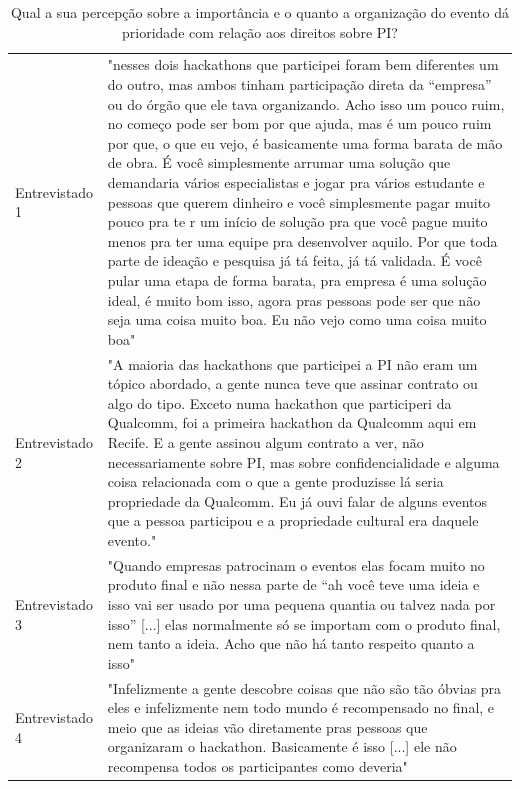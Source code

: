 \begin{table}[H]
\centering
\caption{Qual a sua percepção sobre a importância e o quanto a organização do evento dá prioridade com relação aos direitos sobre PI?}
\label{tab:importancia-prioridade-PI}
\begin{tabular}{l|p{}}

Entrevistado 1 &
  "nesses dois hackathons que participei foram bem diferentes um do outro, mas ambos tinham participação direta da “empresa” ou do órgão que ele tava organizando. Acho isso um pouco ruim, no começo pode ser bom por que ajuda, mas é um pouco ruim por que, o que eu vejo, é basicamente uma forma barata de mão de obra. É você simplesmente arrumar uma solução que demandaria vários especialistas e jogar pra vários estudante e pessoas que querem dinheiro e você simplesmente pagar muito pouco pra te r um início de solução pra que você pague muito menos pra ter uma equipe pra desenvolver aquilo. Por que toda parte de ideação e pesquisa já tá feita, já tá validada. É você pular uma etapa de forma barata, pra empresa é uma solução ideal, é muito bom isso, agora pras pessoas pode ser que não seja uma coisa muito boa. Eu não vejo como uma coisa muito boa" \\
Entrevistado 2 &
  "A maioria das hackathons que participei a PI não eram um tópico abordado, a gente nunca teve que assinar contrato ou algo do tipo. Exceto numa hackathon que participeri da Qualcomm, foi a primeira hackathon da Qualcomm aqui em Recife. E a gente assinou algum contrato a ver, não necessariamente sobre PI, mas sobre confidencialidade e alguma coisa relacionada com o que a gente produzisse lá seria propriedade da Qualcomm. Eu já ouvi falar de alguns eventos que a pessoa participou e a propriedade cultural era daquele evento." \\
Entrevistado 3 &
  "Quando empresas patrocinam o eventos elas focam muito no produto final e não nessa parte de “ah você teve uma ideia e isso vai ser usado por uma pequena quantia ou talvez nada por isso” {[}...{]} elas normalmente só se importam com o produto final, nem tanto a ideia. Acho que não há tanto respeito quanto a isso" \\
Entrevistado 4 &
  "Infelizmente a gente descobre coisas que não são tão óbvias pra eles e infelizmente nem todo mundo é recompensado no final, e meio que as ideias vão diretamente pras pessoas que organizaram o hackathon. Basicamente é isso {[}...{]} ele não recompensa todos os participantes como deveria"
\end{tabular}
\end{table}

